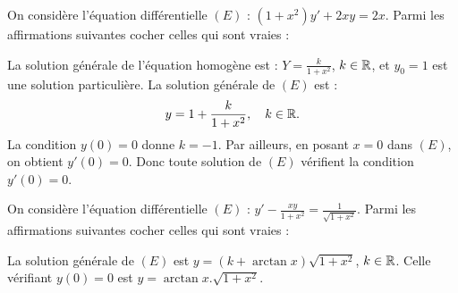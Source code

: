 \begin{question}
On considère l'équation différentielle $(E)$ : $\displaystyle (1+x^2)y'+2xy=2x$. Parmi les affirmations suivantes cocher celles qui sont vraies :
\begin{answers}  
\end{answers}
\begin{explanations}
La solution générale de l'équation homogène est : $\displaystyle Y=\frac{k}{1+x^2}$, $k\in \mathbb{R}$, et $y_0=1$ est une solution particulière. La solution générale de $(E)$ est :
$$y=1+\frac{k}{1+x^2},\quad k\in \mathbb{R}.$$
La condition $y(0)=0$ donne $k=-1$. Par ailleurs, en posant $x=0$ dans $(E)$, on obtient $y'(0)=0$. Donc toute solution de $(E)$ vérifient la condition $y'(0)=0$.
\end{explanations}
\end{question}

\begin{question}
On considère l'équation différentielle $(E)$ : $\displaystyle y'-\frac{xy}{1+x^2}=\frac{1}{\sqrt{1+x^2}}$. Parmi les affirmations suivantes cocher celles qui sont vraies :
\begin{answers}  
\end{answers}
\begin{explanations}
La solution générale de $(E)$ est $y=(k+\arctan x)\sqrt{1+x^2}$, $k\in \mathbb{R}$. Celle vérifiant $y(0)=0$ est $y=\arctan x.\sqrt{1+x^2}$.
\end{explanations}
\end{question}


